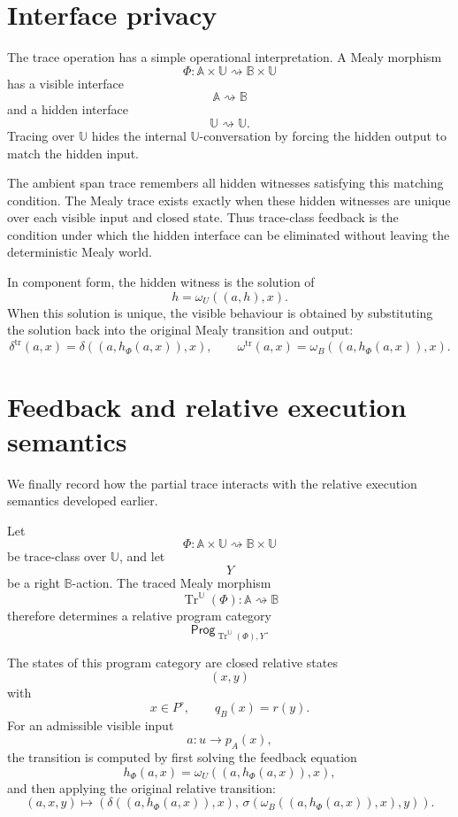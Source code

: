 \section{Interface privacy}
\label{sec:interface-privacy}

The trace operation has a simple operational interpretation.  A Mealy morphism
\[
\Phi:
\mathbb A\times\mathbb U
\rightsquigarrow
\mathbb B\times\mathbb U
\]
has a visible interface
\[
\mathbb A\rightsquigarrow\mathbb B
\]
and a hidden interface
\[
\mathbb U\rightsquigarrow\mathbb U.
\]
Tracing over \(\mathbb U\) hides the internal \(\mathbb U\)-conversation by
forcing the hidden output to match the hidden input.

The ambient span trace remembers all hidden witnesses satisfying this matching
condition.  The Mealy trace exists exactly when these hidden witnesses are
unique over each visible input and closed state.  Thus trace-class feedback is
the condition under which the hidden interface can be eliminated without
leaving the deterministic Mealy world.

In component form, the hidden witness is the solution of
\[
h=\omega_U((a,h),x).
\]
When this solution is unique, the visible behaviour is obtained by substituting
the solution back into the original Mealy transition and output:
\[
\delta^{\operatorname{tr}}(a,x)
=
\delta((a,h_\Phi(a,x)),x),
\qquad
\omega^{\operatorname{tr}}(a,x)
=
\omega_B((a,h_\Phi(a,x)),x).
\]

\section{Feedback and relative execution semantics}
\label{sec:feedback-relative-execution-semantics}

We finally record how the partial trace interacts with the relative execution
semantics developed earlier.

Let
\[
\Phi:
\mathbb A\times\mathbb U
\rightsquigarrow
\mathbb B\times\mathbb U
\]
be trace-class over \(\mathbb U\), and let
\[
Y
\]
be a right \(\mathbb B\)-action.  The traced Mealy morphism
\[
\operatorname{Tr}^{\mathbb U}(\Phi):
\mathbb A\rightsquigarrow\mathbb B
\]
therefore determines a relative program category
\[
\mathsf{Prog}_{\operatorname{Tr}^{\mathbb U}(\Phi),Y}.
\]

The states of this program category are closed relative states
\[
(x,y)
\]
with
\[
x\in P^\circ,
\qquad
q_B(x)=r(y).
\]
For an admissible visible input
\[
a:u\to p_A(x),
\]
the transition is computed by first solving the feedback equation
\[
h_\Phi(a,x)=\omega_U((a,h_\Phi(a,x)),x),
\]
and then applying the original relative transition:
\[
(a,x,y)
\longmapsto
\left(
\delta((a,h_\Phi(a,x)),x),
\,
\sigma(\omega_B((a,h_\Phi(a,x)),x),y)
\right).
\]

